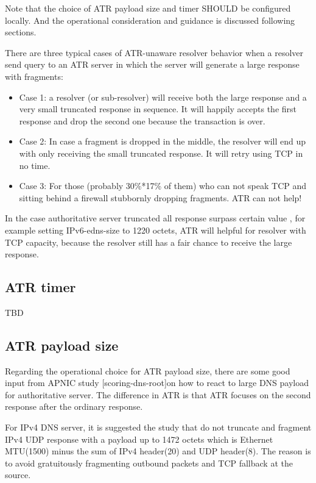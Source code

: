    Note that the choice of ATR payload size and timer SHOULD be
   configured locally.  And the operational consideration and guidance
   is discussed following sections.

   There are three typical cases of ATR-unaware resolver behavior when a
   resolver send query to an ATR server in which the server will
   generate a large response with fragments:

   \begin{itemize}
  \item Case 1: a resolver (or sub-resolver) will receive both the large
   response and a very small truncated response in sequence.  It will
   happily accepts the first response and drop the second one because
   the transaction is over.
  \item Case 2: In case a fragment is dropped in the middle, the resolver
   will end up with only receiving the small truncated response.  It
   will retry using TCP in no time.
  \item Case 3: For those (probably 30\%*17\% of them) who can not speak TCP
      and sitting behind a firewall stubbornly dropping fragments.  ATR can 
      not help!
\end{itemize}

   In the case authoritative server truncated all response surpass
   certain value , for example setting IPv6-edns-size to 1220 octets,
   ATR will helpful for resolver with TCP capacity, because the resolver
   still has a fair chance to receive the large response.

   \subsection{ATR timer}

   TBD

   \subsection{ATR payload size}
      Regarding the operational choice for ATR payload size, there are some
   good input from APNIC study [scoring-dns-root]on how to react to
   large DNS payload for authoritative server.  The difference in ATR is
   that ATR focuses on the second response after the ordinary response.

   For IPv4 DNS server, it is suggested the study that do not truncate
   and fragment IPv4 UDP response with a payload up to 1472 octets which
   is Ethernet MTU(1500) minus the sum of IPv4 header(20) and UDP
   header(8).  The reason is to avoid gratuitously fragmenting outbound
   packets and TCP fallback at the source.

